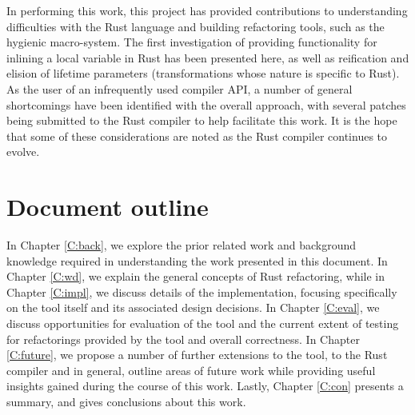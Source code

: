 In performing this work, this project has provided contributions to understanding difficulties with the Rust language and building refactoring tools, such as the hygienic macro-system. The first investigation of providing functionality for inlining a local variable in Rust has been presented here, as well as reification and elision of lifetime parameters (transformations whose nature is specific to Rust). As the user of an infrequently used compiler API, a number of general shortcomings have been identified with the overall approach, with several patches being submitted to the Rust compiler to help facilitate this work. It is the hope that some of these considerations are noted as the Rust compiler continues to evolve.

\section{Document outline}\label{S:outline}
In Chapter \ref{C:back}, we explore the prior related work and background knowledge required in understanding the work presented in this document. In Chapter \ref{C:wd}, we explain the general concepts of Rust refactoring, while in Chapter \ref{C:impl}, we discuss details of the implementation, focusing specifically on the tool itself and its associated design decisions. In Chapter \ref{C:eval}, we discuss opportunities for evaluation of the tool and the current extent of testing for refactorings provided by the tool and overall correctness. In Chapter \ref{C:future}, we propose a number of further extensions to the tool, to the Rust compiler and in general, outline areas of future work while providing useful insights gained during the course of this work. Lastly, Chapter \ref{C:con} presents a summary, and gives conclusions about this work.
